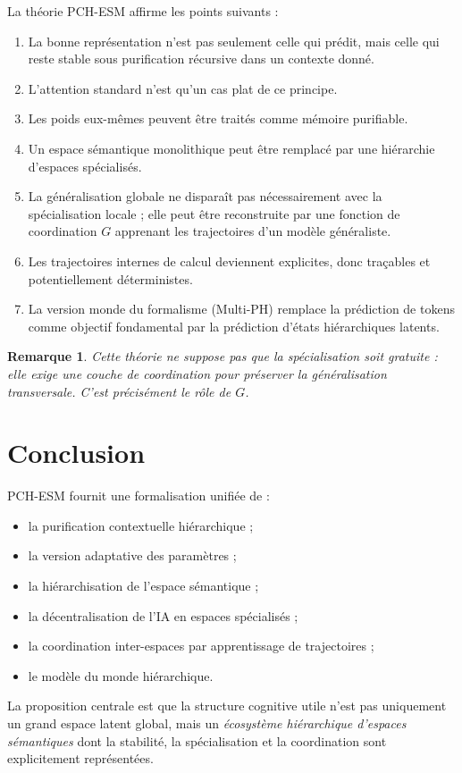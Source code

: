 \documentclass[11pt,a4paper]{article}
\newtheorem{remark}{Remarque}[section]
\newcommand{\1}{\mathbf 1}
\begin{document}
La théorie PCH-ESM affirme les points suivants :

\begin{enumerate}[leftmargin=2em]
    \item La bonne représentation n'est pas seulement celle qui prédit, mais celle qui reste stable sous purification récursive dans un contexte donné.
    \item L'attention standard n'est qu'un cas plat de ce principe.
    \item Les poids eux-mêmes peuvent être traités comme mémoire purifiable.
    \item Un espace sémantique monolithique peut être remplacé par une hiérarchie d'espaces spécialisés.
    \item La généralisation globale ne disparaît pas nécessairement avec la spécialisation locale ; elle peut être reconstruite par une fonction de coordination \(G\) apprenant les trajectoires d'un modèle généraliste.
    \item Les trajectoires internes de calcul deviennent explicites, donc traçables et potentiellement déterministes.
    \item La version monde du formalisme (Multi-PH) remplace la prédiction de tokens comme objectif fondamental par la prédiction d'états hiérarchiques latents.
\end{enumerate}

\begin{remark}
Cette théorie ne suppose pas que la spécialisation soit gratuite : elle exige une couche de coordination pour préserver la généralisation transversale. C'est précisément le rôle de \(G\).
\end{remark}

\section{Conclusion}

PCH-ESM fournit une formalisation unifiée de :
\begin{itemize}[leftmargin=2em]
    \item la purification contextuelle hiérarchique ;
    \item la version adaptative des paramètres ;
    \item la hiérarchisation de l'espace sémantique ;
    \item la décentralisation de l'IA en espaces spécialisés ;
    \item la coordination inter-espaces par apprentissage de trajectoires ;
    \item le modèle du monde hiérarchique.
\end{itemize}

La proposition centrale est que la structure cognitive utile n'est pas uniquement un grand espace latent global, mais un \emph{écosystème hiérarchique d'espaces sémantiques} dont la stabilité, la spécialisation et la coordination sont explicitement représentées.
\end{document}
